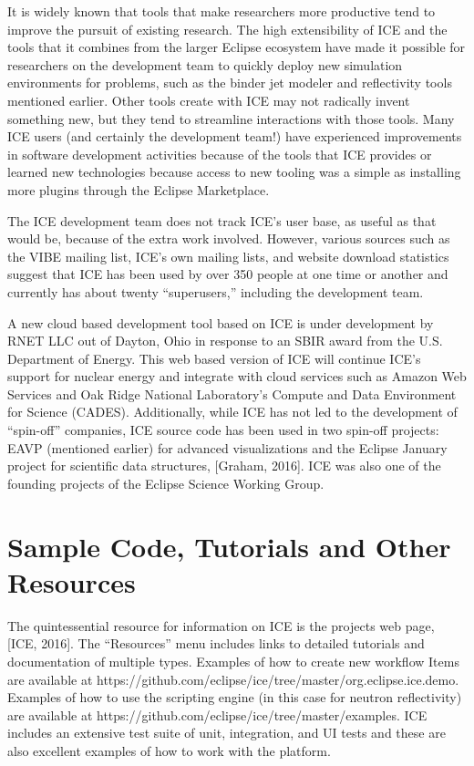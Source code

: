 It is widely known that tools that make researchers more productive tend
to improve the pursuit of existing research. The high extensibility of
ICE and the tools that it combines from the larger Eclipse ecosystem
have made it possible for researchers on the development team to quickly
deploy new simulation environments for problems, such as the binder jet
modeler and reflectivity tools mentioned earlier. Other tools create
with ICE may not radically invent something new, but they tend to
streamline interactions with those tools. Many ICE users (and certainly
the development team!) have experienced improvements in software
development activities because of the tools that ICE provides or learned
new technologies because access to new tooling was a simple as
installing more plugins through the Eclipse Marketplace.

The ICE development team does not track ICE's user base, as useful as
that would be, because of the extra work involved. However, various
sources such as the VIBE mailing list, ICE's own mailing lists, and
website download statistics suggest that ICE has been used by over 350
people at one time or another and currently has about twenty
``superusers,'' including the development team.

A new cloud based development tool based on ICE is under development by
RNET LLC out of Dayton, Ohio in response to an SBIR award from the U.S.
Department of Energy. This web based version of ICE will continue ICE's
support for nuclear energy and integrate with cloud services such as
Amazon Web Services and Oak Ridge National Laboratory's Compute and Data
Environment for Science (CADES). Additionally, while ICE has not led to
the development of ``spin-off'' companies, ICE source code has been used
in two spin-off projects: EAVP (mentioned earlier) for advanced
visualizations and the Eclipse January project for scientific data
structures, {[}Graham, 2016{]}. ICE was also one of the founding
projects of the Eclipse Science Working Group.

\section{Sample Code, Tutorials and Other
Resources}\label{sample-code-tutorials-and-other-resources}

The quintessential resource for information on ICE is the projects web
page, {[}ICE, 2016{]}. The ``Resources'' menu includes links to detailed
tutorials and documentation of multiple types. Examples of how to create
new workflow Items are available at
https://github.com/eclipse/ice/tree/master/org.eclipse.ice.demo.
Examples of how to use the scripting engine (in this case for neutron
reflectivity) are available at
https://github.com/eclipse/ice/tree/master/examples. ICE includes an
extensive test suite of unit, integration, and UI tests and these are
also excellent examples of how to work with the platform.

